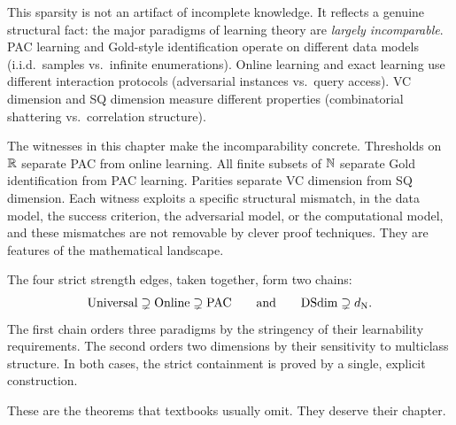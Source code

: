 This sparsity is not an artifact of incomplete knowledge. It reflects a
genuine structural fact: the major paradigms of learning theory are
\emph{largely incomparable}. PAC learning and Gold-style identification
operate on different data models (i.i.d.\ samples vs.\ infinite
enumerations). Online learning and exact learning use different
interaction protocols (adversarial instances vs.\ query access).
VC dimension and SQ dimension measure different properties
(combinatorial shattering vs.\ correlation structure).

The witnesses in this chapter make the incomparability concrete.
Thresholds on $\mathbb{R}$ separate PAC from online learning. All finite subsets
of $\mathbb{N}$ separate Gold identification from PAC learning. Parities
separate VC dimension from SQ dimension. Each witness exploits a specific
structural mismatch, in the data model, the success criterion, the
adversarial model, or the computational model, and these mismatches are
not removable by clever proof techniques. They are features of the
mathematical landscape.

The four strict strength edges, taken together, form two chains:
\[
\text{Universal} \supsetneq \text{Online} \supsetneq \text{PAC}
\qquad \text{and} \qquad
\mathrm{DSdim} \supsetneq d_{\mathrm{N}}.
\]
The first chain orders three paradigms by the stringency of their
learnability requirements. The second orders two dimensions by their
sensitivity to multiclass structure. In both cases, the strict
containment is proved by a single, explicit construction.

These are the theorems that textbooks usually omit. They deserve
their chapter.
